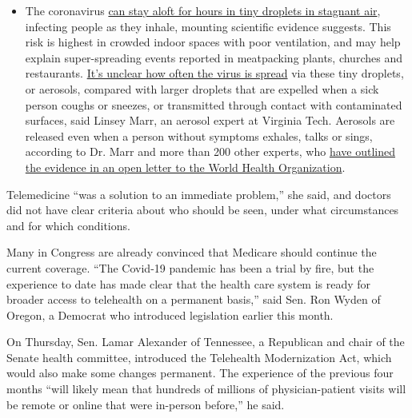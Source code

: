 \begin{itemize}
  \begin{itemize}
  \tightlist
  \item
    The coronavirus
    \href{https://www.nytimes.com/2020/07/04/health/239-experts-with-one-big-claim-the-coronavirus-is-airborne.html?action=click\&pgtype=Article\&state=default\&region=MAIN_CONTENT_3\&context=storylines_faq}{can
    stay aloft for hours in tiny droplets in stagnant air}, infecting
    people as they inhale, mounting scientific evidence suggests. This
    risk is highest in crowded indoor spaces with poor ventilation, and
    may help explain super-spreading events reported in meatpacking
    plants, churches and restaurants.
    \href{https://www.nytimes.com/2020/07/06/health/coronavirus-airborne-aerosols.html?action=click\&pgtype=Article\&state=default\&region=MAIN_CONTENT_3\&context=storylines_faq}{It's
    unclear how often the virus is spread} via these tiny droplets, or
    aerosols, compared with larger droplets that are expelled when a
    sick person coughs or sneezes, or transmitted through contact with
    contaminated surfaces, said Linsey Marr, an aerosol expert at
    Virginia Tech. Aerosols are released even when a person without
    symptoms exhales, talks or sings, according to Dr. Marr and more
    than 200 other experts, who
    \href{https://academic.oup.com/cid/article/doi/10.1093/cid/ciaa939/5867798}{have
    outlined the evidence in an open letter to the World Health
    Organization}.
  \end{itemize}
\end{itemize}

Telemedicine ``was a solution to an immediate problem,'' she said, and
doctors did not have clear criteria about who should be seen, under what
circumstances and for which conditions.

Many in Congress are already convinced that Medicare should continue the
current coverage. ``The Covid-19 pandemic has been a trial by fire, but
the experience to date has made clear that the health care system is
ready for broader access to telehealth on a permanent basis,'' said Sen.
Ron Wyden of Oregon, a Democrat who introduced legislation earlier this
month.

On Thursday, Sen. Lamar Alexander of Tennessee, a Republican and chair
of the Senate health committee, introduced the Telehealth Modernization
Act, which would also make some changes permanent. The experience of the
previous four months ``will likely mean that hundreds of millions of
physician-patient visits will be remote or online that were in-person
before,'' he said.

